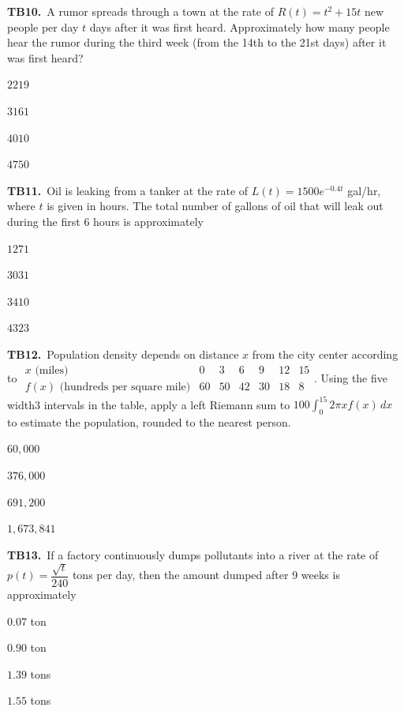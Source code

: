 \documentclass[11pt]{article}
\begin{document}
\bigskip\noindent\textbf{TB10.}\ A rumor spreads through a town at the rate of $R(t)=t^2+15t$ new people per day $t$ days after it was first heard. Approximately how many people hear the rumor during the third week (from the 14th to the 21st days) after it was first heard?
\begin{list}{}{\setlength{\leftmargin}{3em}\setlength{\labelwidth}{2.5em}\setlength{\itemsep}{0pt}\setlength{\topsep}{2pt}}
\item[(A)] $2219$
\item[(B)] $3161$
\item[(C)] $4010$
\item[(D)] $4750$
\end{list}

\bigskip\noindent\textbf{TB11.}\ Oil is leaking from a tanker at the rate of $L(t)=1500e^{-0.4t}$ gal/hr, where $t$ is given in hours. The total number of gallons of oil that will leak out during the first 6 hours is approximately
\begin{list}{}{\setlength{\leftmargin}{3em}\setlength{\labelwidth}{2.5em}\setlength{\itemsep}{0pt}\setlength{\topsep}{2pt}}
\item[(A)] $1271$
\item[(B)] $3031$
\item[(C)] $3410$
\item[(D)] $4323$
\end{list}

\bigskip\noindent\textbf{TB12.}\ Population density depends on distance $x$ from the city center according to $\begin{array}{c|rrrrrr}x\text{ (miles)}&0&3&6&9&12&15\\\hline f(x)\text{ (hundreds per square mile)}&60&50&42&30&18&8\end{array}$. Using the five width3 intervals in the table, apply a left Riemann sum to $100\int_0^{15}2\pi x f(x)\,dx$ to estimate the population, rounded to the nearest person.
\begin{list}{}{\setlength{\leftmargin}{3em}\setlength{\labelwidth}{2.5em}\setlength{\itemsep}{0pt}\setlength{\topsep}{2pt}}
\item[(A)] $60{,}000$
\item[(B)] $376{,}000$
\item[(C)] $691{,}200$
\item[(D)] $1{,}673{,}841$
\end{list}

\bigskip\noindent\textbf{TB13.}\ If a factory continuously dumps pollutants into a river at the rate of $p(t)=\dfrac{\sqrt{t}}{240}$ tons per day, then the amount dumped after 9 weeks is approximately
\begin{list}{}{\setlength{\leftmargin}{3em}\setlength{\labelwidth}{2.5em}\setlength{\itemsep}{0pt}\setlength{\topsep}{2pt}}
\item[(A)] $0.07$ ton
\item[(B)] $0.90$ ton
\item[(C)] $1.39$ tons
\item[(D)] $1.55$ tons
\end{list}
\end{document}
